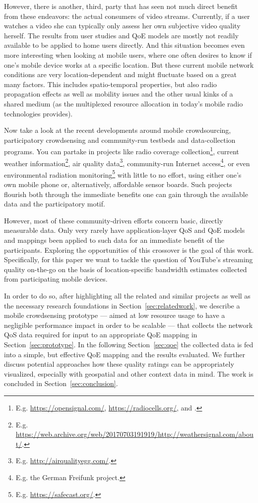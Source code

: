 However, there is another, third, party that has seen not much direct benefit from these endeavors: the actual consumers of video streams. Currently, if a user watches a video she can typically only assess her own subjective video quality herself. The results from user studies and \gls{QoE} models are mostly not readily available to be applied to home users directly. And this situation becomes even more interesting when looking at mobile users, where one often desires to know if one's mobile device works at a specific location. But these current mobile network conditions are very location-dependent and might fluctuate based on a great many factors. This includes spatio-temporal properties, but also radio propagation effects as well as mobility issues and the other usual kinks of a shared medium (as the multiplexed resource allocation in today's mobile radio technologies provides).

Now take a look at the recent developments around mobile crowdsourcing, participatory crowdsensing and community-run testbeds and data-collection programs. You can partake in projects like radio coverage collection\footnote{E.g. \url{https://opensignal.com/}, \url{https://radiocells.org/}, and \cite{raf2013sensorium}.}, current weather information\footnote{E.g. \url{https://web.archive.org/web/20170703191919/http://weathersignal.com/about/}.}, air quality data\footnote{E.g. \url{http://airqualityegg.com/}.}, community-run Internet access\footnote{E.g. the German Freifunk project.}, or even environmental radiation monitoring\footnote{E.g. \url{https://safecast.org/}.} with little to no effort, using either one's own mobile phone or, alternatively, affordable sensor boards. Such projects flourish both through the immediate benefits one can gain through the available data and the participatory motif.

However, most of these community-driven efforts concern basic, directly measurable data. Only very rarely \cite{Nam:2014:YPA:2619239.2631433,7194076} have application-layer \gls{QoS} and \gls{QoE} models and mappings been applied to such data for an immediate benefit of the participants. Exploring the opportunities of this crossover is the goal of this work. Specifically, for this paper we want to tackle the question of YouTube's streaming quality on-the-go on the basis of location-specific bandwidth estimates collected from participating mobile devices.

In order to do so, after highlighting all the related and similar projects as well as the necessary research foundations in Section~\ref{sec:relatedwork}, we describe a mobile crowdsensing prototype --- aimed at low resource usage to have a negligible performance impact in order to be scalable --- that collects the network \gls{QoS} data required for input to an appropriate \gls{QoE} mapping in Section~\ref{sec:prototype}. In the following Section~\ref{sec:qoe} the collected data is fed into a simple, but effective \gls{QoE} mapping and the results evaluated. We further discuss potential approaches how these quality ratings can be appropriately visualized, especially with geospatial and other context data in mind. The work is concluded in Section~\ref{sec:conclusion}.
